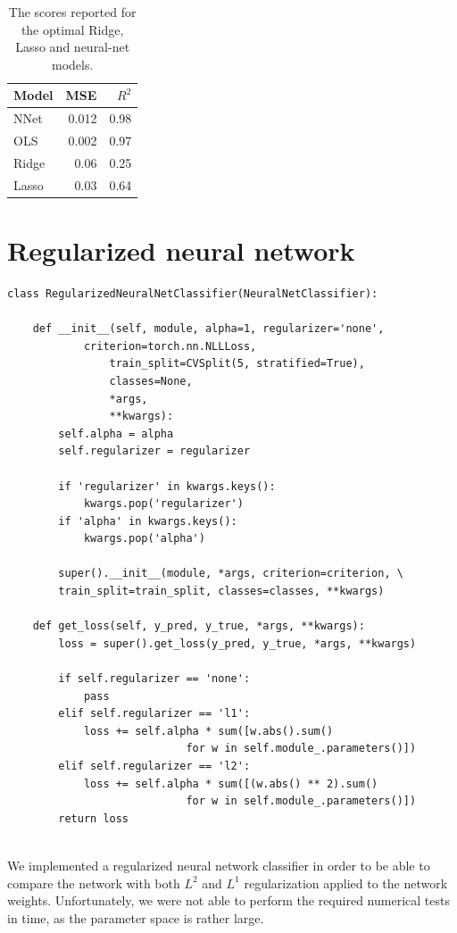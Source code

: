 \documentclass[a4paper, 11pt, oneside, article]{memoir}
\begin{document}
	\begin{table}[htpb]
		\centering
		\caption{The scores reported for the optimal Ridge, Lasso and neural-net models.}
		\label{tab:optimal_models_scores}
		\begin{tabular}{lrr}
			\toprule
			{Model} & MSE   & \( R^2 \) \\
			\midrule			
			NNet & 0.012 & 0.98 \\
			OLS & 0.002 & 0.97 \\
			Ridge & 0.06 & 0.25\\
			Lasso & 0.03 & 0.64\\
			\bottomrule
		\end{tabular}
	\end{table}
	
\clearpage
\appendix

\chapter{Regularized neural network}
	\begin{listing}[htbp]
	\begin{verbatim}
class RegularizedNeuralNetClassifier(NeuralNetClassifier):

    def __init__(self, module, alpha=1, regularizer='none', 
    		criterion=torch.nn.NLLLoss,
                train_split=CVSplit(5, stratified=True),
                classes=None,
                *args,
                **kwargs):
        self.alpha = alpha
        self.regularizer = regularizer

        if 'regularizer' in kwargs.keys():
            kwargs.pop('regularizer')
        if 'alpha' in kwargs.keys():
            kwargs.pop('alpha')

        super().__init__(module, *args, criterion=criterion, \
		train_split=train_split, classes=classes, **kwargs)

    def get_loss(self, y_pred, y_true, *args, **kwargs):
        loss = super().get_loss(y_pred, y_true, *args, **kwargs)

        if self.regularizer == 'none':
            pass
        elif self.regularizer == 'l1':
            loss += self.alpha * sum([w.abs().sum() 
	    					for w in self.module_.parameters()])
        elif self.regularizer == 'l2':
            loss += self.alpha * sum([(w.abs() ** 2).sum() 
	    					for w in self.module_.parameters()])
        return loss
		
	\end{verbatim}
	\caption{We implemented a regularized neural network classifier in
	order to be able to compare the network with both \( L^2 \) and \( L^1
	\) regularization applied to the network weights. Unfortunately, we were not
	able to perform the required numerical tests in time, as the parameter space is
	rather large.}
	\label{lst:rnnc}
	\end{listing}
	
\end{document}
